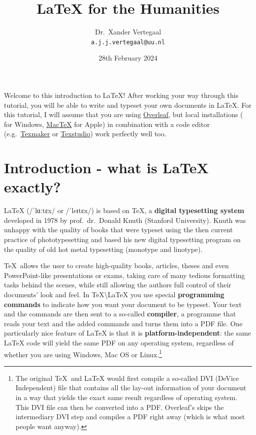 \documentclass{article}
\title{\LaTeX{} for the Humanities}
\author{Dr.\ Xander Vertegaal\\\texttt{a.j.j.vertegaal@uu.nl}}
\date{28th February 2024}
\newcommand{\ipa}[1]{{\charissil #1}}
\newcommand{\definition}[1]{\textbf{#1}}
\begin{document}
\maketitle

Welcome to this introduction to \LaTeX! After working your way through this tutorial, you will be able to write and typeset your own documents in \LaTeX. For this tutorial, I will assume that you are using \href{www.overleaf.com}{Overleaf}, but local installations (\href{https://miktex.org/}{} for Windows, \href{http://www.tug.org/mactex/}{Mac\TeX{}} for Apple) in combination with a code editor (e.g.\ \href{https://www.xm1math.net/texmaker/}{Texmaker} or \href{https://www.texstudio.org/}{Texstudio}) work perfectly well too.

\section{Introduction - what is \LaTeX{} exactly?}\label{secintro}

\LaTeX{} (\ipa{/ˈlɑːtɛx/ or /ˈleɪtɛx/}) is based on \TeX, a \definition{digital typesetting system} developed in 1978 by prof.~dr.~Donald Knuth (Stanford University). Knuth was unhappy with the quality of books that were typeset using the then current practice of phototypesetting and based his new digital typesetting program on the quality of old hot metal typesetting (monotype and linotype).

\TeX\ allows the user to create high-quality books, articles, theses and even PowerPoint-like presentations or exams, taking care of many tedious formatting tasks behind the scenes, while still allowing the authors full control of their documents' look and feel. In \TeX\textbackslash\LaTeX{} you use special \definition{programming commands} to indicate how you want your document to be typeset. Your text and the commands are then sent to a so-called \definition{compiler}, a programme that reads your text and the added commands and turns them into a PDF file. One particularly nice feature of \LaTeX{} is that it is \definition{platform-independent}: the same \LaTeX{} code will yield the same PDF on any operating system, regardless of whether you are using Windows, Mac OS or Linux.\footnote{The original \TeX\ and \LaTeX{} would first compile a so-called DVI (DeVice Independent) file that contains all the lay-out information of your document in a way that yields the exact same result regardless of operating system. This DVI file can then be converted into a PDF. Overleaf's  skips the intermediary DVI step and compiles a PDF right away (which is what most people want anyway).}
\end{document}
